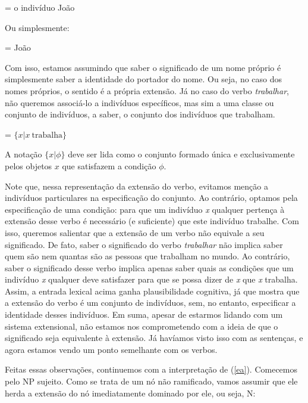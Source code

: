 \begin{exe}
	\ex {} = o indivíduo João
\end{exe}

\n Ou simplesmente:

\begin{exe}
	\ex {} = João
\end{exe}

Com isso, estamos assumindo que saber o significado de um nome próprio é simplesmente saber a identidade do portador do nome. Ou seja, no caso dos nomes próprios, o sentido é a própria extensão. Já no caso do verbo \textit{trabalhar}, não queremos associá-lo a indivíduos específicos, mas sim a uma classe ou conjunto de indivíduos, a saber, o conjunto dos indivíduos que trabalham.

\begin{exe}
	\ex {} = $\{x | x\ \text{trabalha}\}$
\end{exe}

\n A notação $\{x | \phi \}$ deve ser lida como o conjunto formado única e exclusivamente pelos objetos $x$ que satisfazem a condição $\phi$.

Note que, nessa representação da extensão do verbo, evitamos menção a indivíduos particulares na especificação do conjunto. Ao contrário, optamos pela especificação de uma condição: para que um indivíduo \textit{x} qualquer pertença à extensão desse verbo é necessário (e suficiente) que este indivíduo trabalhe. Com isso, queremos salientar que a extensão de um verbo não equivale a seu significado. De fato, saber o significado do verbo \textit{trabalhar} não implica saber quem são nem quantas são as pessoas que trabalham no mundo. Ao contrário, saber o significado desse verbo implica apenas saber quais as condições que um indivíduo \textit{x} qualquer deve satisfazer para que se possa dizer de \textit{x} que \textit{x} trabalha. Assim, a entrada lexical acima ganha plausibilidade cognitiva, já que mostra que a extensão do verbo é um conjunto de indivíduos, sem, no entanto, especificar a identidade desses indivíduos. Em suma, apesar de estarmos lidando com um sistema extensional, não estamos nos comprometendo com a ideia de que o significado seja equivalente à extensão. Já havíamos visto isso com as sentenças, e agora estamos vendo um ponto semelhante com os verbos.

Feitas essas observações, continuemos com a interpretação de (\ref{ea}). Comecemos pelo NP sujeito. Como se trata de um nó não ramificado, vamos assumir que ele herda a extensão do nó imediatamente dominado por ele, ou seja, N:

